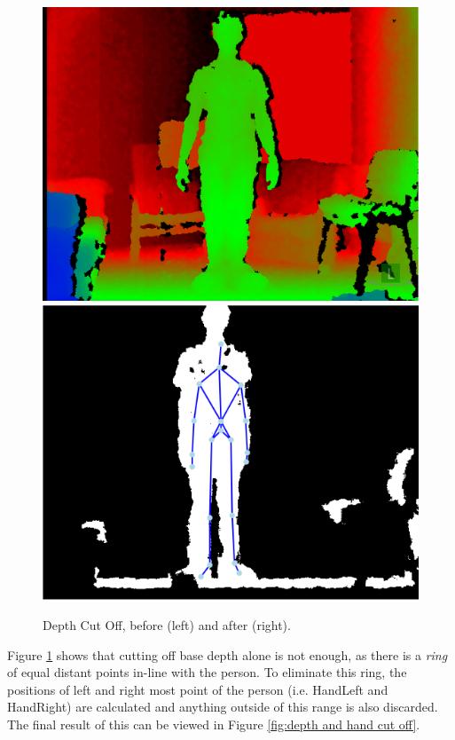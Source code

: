 \begin{figure}[h]
\begin{center}
\includegraphics[scale=0.4]{./design/parse1} 
\includegraphics[scale=0.4]{./design/parse2}
\end{center}
\caption{Depth Cut Off, before (left) and after (right).}
\label{fig:depth cut off}
\end{figure} 

Figure \ref{fig:depth cut off} shows that cutting off base depth alone is not enough, as there is a \textit{ring} of equal distant points in-line with the person. To eliminate this ring, the positions of left and right most point of the person (i.e. HandLeft and HandRight) are calculated and anything outside of this range is also discarded. The final result of this can be viewed in Figure \ref{fig:depth and hand cut off}.

